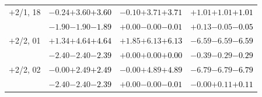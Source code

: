 \documentclass[compress]{beamer}
\begin{document}
\begin{frame}
\begin{tabular}{r | c | c | c}
$+$2/1, 18 & $-0.24$\hspace{0.1 cm}$+3.60$\hspace{0.1 cm}\textcolor{black}{$+3.60$} & $-0.10$\hspace{0.1 cm}$+3.71$\hspace{0.1 cm}\textcolor{black}{$+3.71$} & $+1.01$\hspace{0.1 cm}$+1.01$\hspace{0.1 cm}\textcolor{black}{$+1.01$} \\
           & $-1.90$\hspace{0.1 cm}$-1.90$\hspace{0.1 cm}\textcolor{black}{$-1.89$} & $+0.00$\hspace{0.1 cm}$-0.00$\hspace{0.1 cm}\textcolor{black}{$-0.01$} & $+0.13$\hspace{0.1 cm}$-0.05$\hspace{0.1 cm}\textcolor{black}{$-0.05$} \\
$+$2/2, 01 & $+1.34$\hspace{0.1 cm}$+4.64$\hspace{0.1 cm}\textcolor{black}{$+4.64$} & $+1.85$\hspace{0.1 cm}$+6.13$\hspace{0.1 cm}\textcolor{black}{$+6.13$} & $-6.59$\hspace{0.1 cm}$-6.59$\hspace{0.1 cm}\textcolor{black}{$-6.59$} \\
           & $-2.40$\hspace{0.1 cm}$-2.40$\hspace{0.1 cm}\textcolor{black}{$-2.39$} & $+0.00$\hspace{0.1 cm}$+0.00$\hspace{0.1 cm}\textcolor{black}{$+0.00$} & $-0.39$\hspace{0.1 cm}$-0.29$\hspace{0.1 cm}\textcolor{black}{$-0.29$} \\
$+$2/2, 02 & $-0.00$\hspace{0.1 cm}$+2.49$\hspace{0.1 cm}\textcolor{black}{$+2.49$} & $-0.00$\hspace{0.1 cm}$+4.89$\hspace{0.1 cm}\textcolor{black}{$+4.89$} & $-6.79$\hspace{0.1 cm}$-6.79$\hspace{0.1 cm}\textcolor{black}{$-6.79$} \\
           & $-2.40$\hspace{0.1 cm}$-2.40$\hspace{0.1 cm}\textcolor{black}{$-2.39$} & $+0.00$\hspace{0.1 cm}$-0.00$\hspace{0.1 cm}\textcolor{black}{$-0.01$} & $-0.00$\hspace{0.1 cm}$+0.11$\hspace{0.1 cm}\textcolor{black}{$+0.11$} \\

\end{tabular}
\end{frame}
\end{document}
